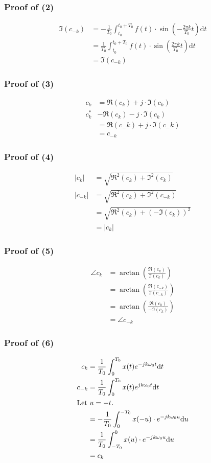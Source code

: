 \documentclass[10pt]{article}
\begin{document}
\subsubsection*{Proof of (2)}
\begin{align*}
    \mathfrak{I}(c_{-k}) &= -\frac{1}{T_0} \int_{t_0}^{t_0 + T_0}f(t) \cdot \sin\left(-\frac{2\pi k}{T_0} t\right) \text{d}t\\
    &= \frac{1}{T_0} \int_{t_0}^{t_0 + T_0}f(t) \cdot \sin\left(\frac{2\pi k}{T_0} t\right) \text{d}t\\
    &= \mathfrak{I}(c_{-k})
\end{align*}
\subsubsection*{Proof of (3)}
\begin{align*}
    c_k &= \mathfrak{R}(c_k) + j \cdot \mathfrak{I}(c_k)\\
    c_k^* &- \mathfrak{R}(c_k) - j \cdot \mathfrak{I}(c_k)\\
    &= \mathfrak{R}(c_-k) + j \cdot \mathfrak{I}(c_-k)\\
    &= c_{-k}
\end{align*}
\subsubsection*{Proof of (4)}
\begin{align*}
    |c_k| &= \sqrt{\mathfrak{R}^2(c_k) + \mathfrak{I}^2(c_k)}\\
    |c_{-k}| &= \sqrt{\mathfrak{R}^2(c_k) + \mathfrak{I}^2(c_{-k})}\\
    &= \sqrt{\mathfrak{R}^2(c_k) + (-\mathfrak{I}(c_k))^2}\\
    &= |c_k|
\end{align*}
\subsubsection*{Proof of (5)}
\begin{align*}
    \angle c_k &= \arctan \left(\frac{\mathfrak{R}(c_k)}{\mathfrak{I}(c_k)}\right)\\
    &= \arctan \left(\frac{\mathfrak{R}(c_{-k})}{\mathfrak{I}(c_{-k})}\right)\\
    &= \arctan \left(\frac{\mathfrak{R}(c_{k})}{-\mathfrak{I}(c_k)}\right)\\
    &= \angle c_{-k}
\end{align*}
\subsubsection*{Proof of (6)}
\begin{align*}
    c_k &= \frac{1}{T_0} \int_{0}^{T_0} x(t) e^{-jk\omega_0 t} \text{d}t\\
    c_{-k} &= \frac{1}{T_0} \int_{0}^{T_0} x(t) e^{jk\omega_0 t}\text{d}t\\
    \intertext{Let $u = -t$.}
    &= -\frac{1}{T_0} \int_{0}^{-T_0} x(-u) \cdot e^{-jk\omega_0 u} \text{d}u\\
    &= \frac{1}{T_0} \int_{-T_0}^0 x(u) \cdot e^{-jk\omega_0 u} \text{d}u\\
    &= c_k
\end{align*}
\end{document}
